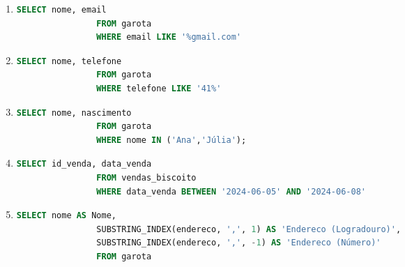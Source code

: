 \documentclass{article}
\begin{document}
\begin{enumerate}[label=\alph*.]
\begin{enumerate}[label=\roman*., labelsep=0.5em, leftmargin=*]
        \item 
        \begin{adjustwidth}{1em}{0pt}
            \begin{lstlisting}[language=SQL]
                SELECT nome, email
                FROM garota
                WHERE email LIKE '%gmail.com'
            \end{lstlisting}
        \end{adjustwidth}

        \item 
        \begin{adjustwidth}{1em}{0pt}
            \begin{lstlisting}[language=SQL]
                SELECT nome, telefone
                FROM garota
                WHERE telefone LIKE '41%'
            \end{lstlisting}
        \end{adjustwidth}

        \item 
        \begin{adjustwidth}{1em}{0pt}
            \begin{lstlisting}[language=SQL]
                SELECT nome, nascimento
                FROM garota
                WHERE nome IN ('Ana','Júlia');
            \end{lstlisting}
        \end{adjustwidth}

        \item 
        \begin{adjustwidth}{1em}{0pt}
            \begin{lstlisting}[language=SQL]
                SELECT id_venda, data_venda
                FROM vendas_biscoito
                WHERE data_venda BETWEEN '2024-06-05' AND '2024-06-08'
            \end{lstlisting}
        \end{adjustwidth}

        \item 
        \begin{adjustwidth}{1em}{0pt}
            \begin{lstlisting}[language=SQL]
                SELECT nome AS Nome, 
                SUBSTRING_INDEX(endereco, ',', 1) AS 'Endereco (Logradouro)', 
                SUBSTRING_INDEX(endereco, ',', -1) AS 'Endereco (Número)'
                FROM garota                
            \end{lstlisting}
        \end{adjustwidth}


\end{enumerate}
\end{enumerate}
\end{document}
